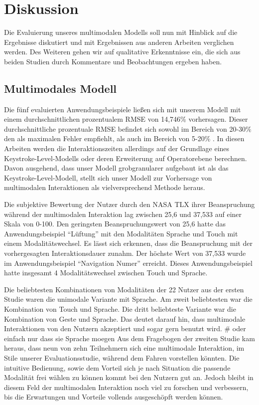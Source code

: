 \clearpage
\section[Diskussion]{Diskussion}
Die Evaluierung unseres multimodalen Modells soll nun mit Hinblick auf die Ergebnisse diskutiert und mit Ergebnissen aus anderen Arbeiten verglichen werden.
Des Weiteren gehen wir auf qualitative Erkenntnisse ein, die sich aus beiden Studien durch Kommentare und Beobachtungen ergeben haben.

\subsection[Modell]{Multimodales Modell}
Die fünf evaluierten Anwendungsbeispiele ließen sich mit unserem Modell mit einem durchschnittlichen prozentualem RMSE von 14,746\% vorhersagen.
Dieser durchschnittliche prozentuale RMSE befindet sich sowohl im Bereich von 20-30\% den \citet{Card_1980} als maximalen Fehler empfiehlt, als auch im Bereich von 5-20\% \citep{Luo_2005,Teo:2006}. 
In diesen Arbeiten werden die Interaktionszeiten allerdings auf der Grundlage eines Keystroke-Level-Modells oder deren Erweiterung auf Operatorebene berechnen. 
Davon ausgehend, dass unser Modell grobgranularer aufgebaut ist als das Keystroke-Level-Modell, stellt sich unser Modell zur Vorhersage von multimodalen Interaktionen als vielversprechend Methode heraus. 

Die subjektive Bewertung der Nutzer durch den NASA TLX ihrer Beanspruchung während der multimodalen Interaktion lag zwischen 25,6 und 37,533 auf einer Skala von 0-100. 
Den geringsten Beanspruchungswert von 25,6 hatte das Anwendungsbeispiel "`Lüftung"' mit den Modalitäten Sprache und Touch mit einem Modalitätswechsel. 
Es lässt sich erkennen, dass die Beanspruchung mit der vorhergesagten Interaktionsdauer zunahm.
Der höchste Wert von 37,533 wurde im Anwendungsbeispiel "`Navigation Numer"' erreicht. 
Dieses Anwendungsbeispiel hatte insgesamt 4 Modalitätswechsel zwischen Touch und Sprache.  

Die beliebtesten Kombinationen von Modalitäten der 22 Nutzer aus der ersten Studie waren die unimodale Variante mit Sprache. 
Am zweit beliebtesten war die Kombination von Touch und Sprache. 
Die dritt beliebteste Variante war die Kombination von Geste und Sprache. 
Das deutet darauf hin, dass multimodale Interaktionen von den Nutzern akzeptiert und sogar gern benutzt wird. # oder einfach nur dass sie Sprache moegen 
Aus dem Fragebogen der zweiten Studie kam heraus, dass neun von zehn Teilnehmern sich eine multimodale Interaktion, im Stile unserer Evaluationsstudie, während dem Fahren vorstellen könnten. 
Die intuitive Bedienung, sowie dem Vorteil sich je nach Situation die passende Modalität frei wählen zu können kommt bei den Nutzern gut an. 
Jedoch bleibt in diesem Feld der multimodalen Interaktion noch viel zu forschen und verbessern, bis die Erwartungen und Vorteile vollends ausgeschöpft werden können.

